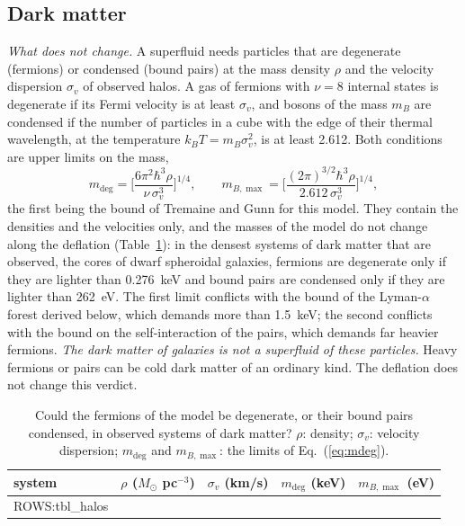\subsection{Dark matter}
\label{sec:dm}

\emph{What does not change.} A superfluid needs particles that are degenerate (fermions) or
condensed (bound pairs) at the mass density $\rho$ and the velocity dispersion $\sigma_v$ of observed
halos. A gas of fermions with $\nu=8$ internal states is degenerate if its Fermi velocity is at
least $\sigma_v$, and bosons of the mass $m_B$ are condensed if the number of particles in a cube
with the edge of their thermal wavelength, at the temperature $k_BT=m_B\sigma_v^{2}$, is at least
2.612. Both conditions are upper limits on the mass,
\begin{equation}
m_{\mathrm{deg}}=\Big[\frac{6\pi^{2}\hbar^{3}\rho}{\nu\,\sigma_v^{3}}\Big]^{1/4},\qquad
m_{B,\max}=\Big[\frac{(2\pi)^{3/2}\hbar^{3}\rho}{2.612\,\sigma_v^{3}}\Big]^{1/4},
\label{eq:mdeg}
\end{equation}
the first being the bound of Tremaine and Gunn \cite{TremaineGunn1979} for this model. They contain
the densities and the velocities only, and the masses of the model do not change along the
deflation (Table~\ref{tab:halos}): in the densest systems of dark matter that are observed, the
cores of dwarf spheroidal galaxies, fermions are degenerate only if they are lighter than 0.276~keV
and bound pairs are condensed only if they are lighter than 262~eV. The first limit conflicts with
the bound of the Lyman-$\alpha$ forest derived below, which demands more than 1.5~keV; the second
conflicts with the bound on the self-interaction of the pairs, which demands far heavier fermions.
\emph{The dark matter of galaxies is not a superfluid of these particles.} Heavy fermions or pairs
can be cold dark matter of an ordinary kind. The deflation does not change this verdict.

\begin{table}
\caption{\label{tab:halos}Could the fermions of the model be degenerate, or their bound pairs
condensed, in observed systems of dark matter? $\rho$: density; $\sigma_v$: velocity dispersion;
$m_{\mathrm{deg}}$ and $m_{B,\max}$: the limits of Eq.~(\ref{eq:mdeg}).}
\begin{ruledtabular}
\begin{tabular}{lcccc}
system & $\rho$ ($M_\odot$ pc$^{-3}$) & $\sigma_v$ (km/s) & $m_{\mathrm{deg}}$ (keV) & $m_{B,\max}$ (eV) \\
\hline
{{ROWS:tbl_halos}}
\end{tabular}
\end{ruledtabular}
\end{table}


